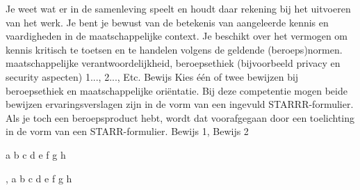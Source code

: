 
\competentie
{%
	\competentieformulier
	{%
		Je weet wat er in de samenleving speelt en houdt daar rekening bij het uitvoeren van het werk. Je bent je bewust van de betekenis van aangeleerde kennis en vaardigheden in de maatschappelijke context. Je beschikt over het vermogen om kennis kritisch te toetsen en te handelen volgens de geldende (beroeps)normen. 
	}
	{%
		maatschappelijke verantwoordelijkheid,%
		beroepsethiek (bijvoorbeeld privacy en security aspecten)%
	}
	{%
		1...,%
		2...,%
		Etc.%
	}
	{%
		Bewijs
	}
	{%
		Kies één of twee bewijzen bij beroepsethiek en maatschappelijke oriëntatie. Bij deze competentie mogen beide bewijzen ervaringsverslagen zijn in de vorm van een ingevuld STARRR-formulier. Als je toch een beroepsproduct  hebt, wordt dat voorafgegaan door een toelichting in de vorm van een STARR-formulier.
	}
	{%
		Bewijs 1,%
		Bewijs 2%
	}
}
{%
	\bewijs
	{%
		a
	}
	{%
		\starr
		{%
			b
		}
		{%
			c
		}
		{%
			d
		}
		{%
			e
		}
		{%
			f
		}
		{%
			g
		}
		{%
			h
		}
	}
	{%
		
	},
	\bewijs
	{%
		a
	}
	{%
		\starr
		{%
			b
		}
		{%
			c
		}
		{%
			d
		}
		{%
			e
		}
		{%
			f
		}
		{%
			g
		}
		{%
			h
		}
	}
	{%
		
	}
}
